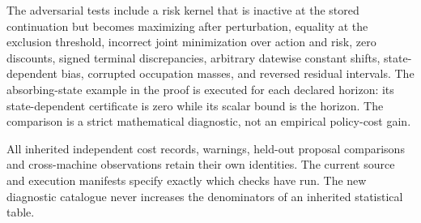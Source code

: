 The adversarial tests include a risk kernel that is inactive at the stored continuation but becomes maximizing after perturbation, equality at the exclusion threshold, incorrect joint minimization over action and risk, zero discounts, signed terminal discrepancies, arbitrary datewise constant shifts, state-dependent bias, corrupted occupation masses, and reversed residual intervals. The absorbing-state example in the proof is executed for each declared horizon: its state-dependent certificate is zero while its scalar bound is the horizon. The comparison is a strict mathematical diagnostic, not an empirical policy-cost gain.

All inherited independent cost records, warnings, held-out proposal comparisons and cross-machine observations retain their own identities. The current source and execution manifests specify exactly which checks have run. The new diagnostic catalogue never increases the denominators of an inherited statistical table.

